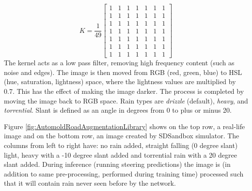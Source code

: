 \begin{equation}
\label{eq:blurring-kernel}
    K = \frac{1}{49} \begin{bmatrix} 1 & 1 & 1 & 1 & 1 & 1 & 1 \\ 
    1 & 1 & 1 & 1 & 1 & 1 & 1 \\ 
    1 & 1 & 1 & 1 & 1 & 1 & 1 \\ 
    1 & 1 & 1 & 1 & 1 & 1 & 1 \\ 
    1 & 1 & 1 & 1 & 1 & 1 & 1 \\ 
    1 & 1 & 1 & 1 & 1 & 1 & 1 \\ 
    1 & 1 & 1 & 1 & 1 & 1 & 1 \end{bmatrix}
\end{equation}
The kernel acts as a low pass filter, removing high frequency content (such as noise and edges). The image is then moved from RGB (red, green, blue) to HSL (hue, saturation, lightness) space, where the lightness values are multiplied by 0.7. This has the effect of making the image darker. The process is completed by moving the image back to RGB space. Rain types are \textit{drizzle} (default), \textit{heavy}, and \textit{torrential}. Slant is defined as an angle in degrees from 0 to plus or minus 20.





Figure \ref{fig:AutomoldRoadAugmentationLibrary} shows on the top row, a real-life image and on the bottom row, an image created by SDSandbox simulator. The columns from left to right have: no rain added, straight falling (0 degree slant) light, heavy with a -10 degree slant added and torrential rain with a 20 degree slant added.  
During inference (running steering predictions) the image is (in addition to same pre-processing, performed during training time) processed such that it will contain rain never seen before by the network. 

